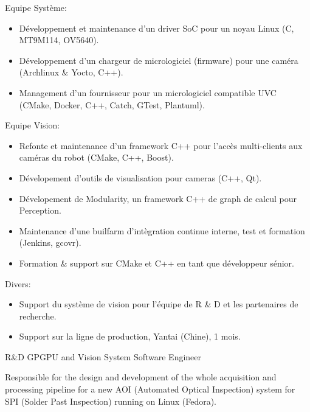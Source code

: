 \documentclass{article}
\begin{document}
\begin{llist}
{Equipe Syst\`{e}me:
\vspace{-0.33cm}
\begin{itemize}
\item D\'{e}veloppement et maintenance d'un driver SoC pour un noyau Linux (C, MT9M114, OV5640).
\item D\'{e}veloppement d'un chargeur de micrologiciel (firmware) pour une cam\'{e}ra (Archlinux \& Yocto, C++).
\item Management d'un fournisseur pour un micrologiciel compatible UVC (CMake, Docker, C++, Catch, GTest, Plantuml).
\end{itemize}
Equipe Vision:
\vspace{-0.33cm}
\begin{itemize}
	\item Refonte et maintenance d'un framework C++ pour l'acc\`{e}s multi-clients aux cam\'{e}ras du robot (CMake, C++, Boost).
	\item D\'{e}velopement d'outils de visualisation pour cameras (C++, Qt).
	\item D\'{e}velopement de Modularity, un framework C++ de graph de calcul pour Perception.
	\item Maintenance d'une builfarm d'int\`{e}gration continue interne, test et formation (Jenkins, gcovr).
	\item Formation \& support sur CMake et C++ en tant que d\'{e}veloppeur s\'{e}nior.
\end{itemize}
Divers:
\vspace{-0.33cm}
\begin{itemize}
	\item Support du syst\`{e}me de vision pour l'\'{e}quipe de R \& D et les partenaires de recherche.
	\item Support sur la ligne de production, Yantai (Chine), 1 mois.
\end{itemize}
}

 {
R\&D GPGPU and Vision System Software Engineer\\
\vspace{-0.33cm}

Responsible for the design and development of the whole acquisition and processing pipeline
for a new AOI (Automated Optical Inspection) system for SPI (Solder Past Inspection)
 running on Linux (Fedora).

}
\end{llist}
\end{document}
